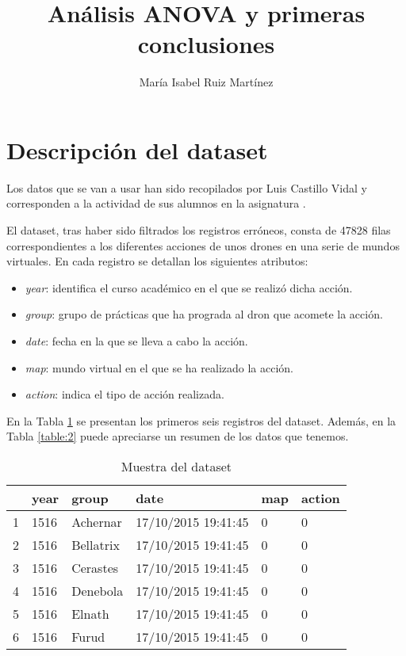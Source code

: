 \documentclass[10pt,a4paper]{article}
\author{María Isabel Ruiz Martínez}
\title{Análisis ANOVA y primeras conclusiones}
\begin{document}
\maketitle

\listoftables
\listoffigures

\section{Descripción del dataset}

Los datos que se van a usar han sido recopilados por Luis Castillo Vidal y corresponden a la actividad de sus alumnos en la asignatura \href{https://www.ugr.es/estudiantes/grados/grado-ingenieria-informatica/desarrollo-basado-agentes-ing-software}{\color{blue}{Desarrollo Basado en Agentes}}.

El dataset, tras haber sido filtrados los registros erróneos, consta de 47828 filas correspondientes a los diferentes acciones de unos drones en una serie de mundos virtuales. En cada registro se detallan los siguientes atributos:
\begin{itemize}
\item \emph{year}: identifica el curso académico en el que se realizó dicha acción.
\item \emph{group}: grupo de prácticas que ha prograda al dron que acomete la acción.
\item \emph{date}: fecha en la que se lleva a cabo la acción.
\item \emph{map}: mundo virtual en el que se ha realizado la acción.
\item \emph{action}: indica el tipo de acción realizada.
\end{itemize}

En la Tabla \ref{table:1} se presentan los primeros seis registros del dataset. Además, en la Tabla \ref{table:2} puede apreciarse un resumen de los datos que tenemos.

\begin{table}[ht]
\centering
\begin{tabular}{rlllll}
  \hline
 & year & group & date & map & action \\ 
  \hline
1 & 1516 & Achernar & 17/10/2015 19:41:45 & 0 & 0 \\ 
  2 & 1516 & Bellatrix & 17/10/2015 19:41:45 & 0 & 0 \\ 
  3 & 1516 & Cerastes & 17/10/2015 19:41:45 & 0 & 0 \\ 
  4 & 1516 & Denebola & 17/10/2015 19:41:45 & 0 & 0 \\ 
  5 & 1516 & Elnath & 17/10/2015 19:41:45 & 0 & 0 \\ 
  6 & 1516 & Furud & 17/10/2015 19:41:45 & 0 & 0 \\ 
   \hline
\end{tabular}
\caption{Muestra del dataset}
\label{table:1}
\end{table}
\end{document}
